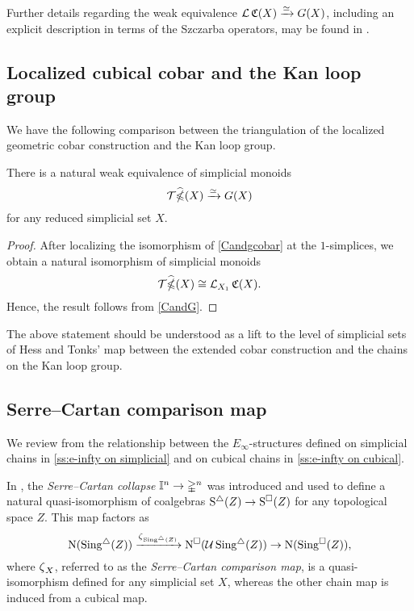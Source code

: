 Further details regarding the weak equivalence $\operatorname{\mathcal{L}} \operatorname{\mathfrak{C}}(X) \xrightarrow{\simeq} G(X)$, including an explicit description in terms of the Szczarba operators, may be found in \cite{minichello2021path}.

\subsection{Localized cubical cobar and the Kan loop group}

We have the following comparison between the triangulation of the localized geometric cobar construction and the Kan loop group.

\begin{corollary} \label{widehatgcobarandG}
	There is a natural weak equivalence of simplicial monoids
	\begin{equation*}
	\mathcal{T} \widehat{\operatorname{\mathbb{\Omega}}}(X) \xrightarrow{\simeq} G(X)
	\end{equation*}
	for any reduced simplicial set $X$.
\end{corollary}

\begin{proof}
	After localizing the isomorphism of \cref{Candgcobar} at the $1$-simplices, we obtain a natural isomorphism of simplicial monoids
	$$\mathcal{T} \widehat{\operatorname{\mathbb{\Omega}}}(X) \cong \operatorname{\mathcal{L}}_{X_1}\operatorname{\mathfrak{C}}(X).$$
	Hence, the result follows from \cref{CandG}.
\end{proof}

The above statement should be understood as a lift to the level of simplicial sets of Hess and Tonks' map between the extended cobar construction and the chains on the Kan loop group.

\subsection{Serre--Cartan comparison map}

We review from \cite{medina2021cubical} the relationship between the $E_\infty$-structures defined on simplicial chains in \cref{ss:e-infty on simplicial} and on cubical chains in \cref{ss:e-infty on cubical}.

In \cite[sect]{serre1951homologie}, the \textit{Serre--Cartan collapse} $\mathbb{I}^n \to \mathbb{\Delta}^n$ was introduced and used to define a natural quasi-isomorphism of coalgebras $\operatorname{S^{\triangle}}(Z) \to \operatorname{S^{\square}}(Z)$ for any topological space $Z$.
This map factors as
\begin{equation*}
\operatorname{N}(\operatorname{Sing^{\triangle}}(Z)) \xrightarrow{\operatorname{\zeta}_{\operatorname{Sing^{\triangle}}(Z)}}
\operatorname{N^{\square}}(\mathcal{U} \operatorname{Sing^{\triangle}}(Z)) \to
\operatorname{N}(\operatorname{Sing^{\square}}(Z)),
\end{equation*}
where $\operatorname{\zeta}_X$, referred to as the \textit{Serre--Cartan comparison map}, is a quasi-isomorphism defined for any simplicial set $X$, whereas the other chain map is induced from a cubical map.

